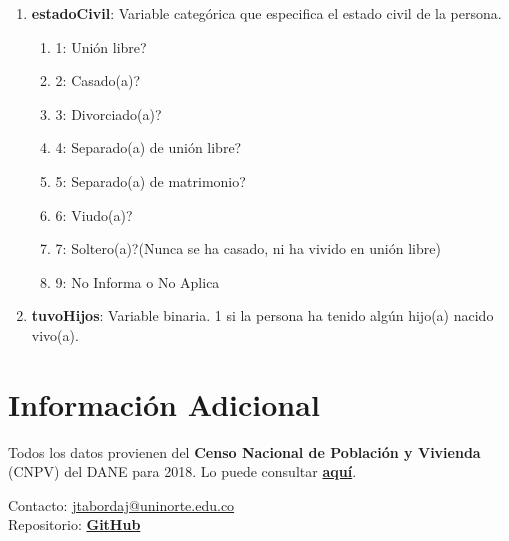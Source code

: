 \documentclass[12pt,a4paper]{article}
\begin{document}
\begin{enumerate}
\begin{enumerate}
		\end{enumerate}
	\item \textbf{estadoCivil}: Variable categórica que especifica el estado civil de la persona.
		\begin{enumerate}
			\item 1: Unión libre?
			\item 2: Casado(a)?
			\item 3: Divorciado(a)?
			\item 4: Separado(a) de unión libre?
			\item 5: Separado(a) de matrimonio?
			\item 6: Viudo(a)?
			\item 7: Soltero(a)?(Nunca se ha casado, ni ha vivido en unión libre)
			\item 9: No Informa o No Aplica
		\end{enumerate}
	\item \textbf{tuvoHijos}: Variable binaria. 1 si la persona ha tenido algún hijo(a) nacido vivo(a).
\end{enumerate}

\section*{Información Adicional}


Todos los datos provienen del \textbf{Censo Nacional de Población y Vivienda} (CNPV) del DANE para 2018. Lo puede consultar \href{https://microdatos.dane.gov.co/index.php/catalog/643/study-description}{\textbf{aquí}}.

\vfill

\noindent Contacto: \href{mailto:jtabordaj@uninorte.edu.co}{jtabordaj@uninorte.edu.co} \\
Repositorio: \textbf{\href{https://github.com/jtabordaj/research_eslatina}{GitHub}}
\end{document}
